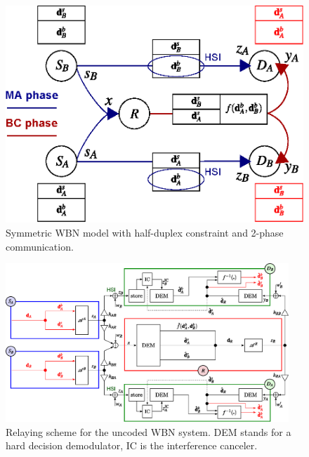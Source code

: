\documentclass{article}
\begin{document}
\begin{figure}
\centering{}
\includegraphics[width=0.6\columnwidth]{fig/2-SRN-sc_principle_BC-TWT_v4}
\caption{Symmetric WBN model with half-duplex constraint and 2-phase communication.\label{fig:CTUpp_Information_flows}}
\end{figure}


\begin{figure}
\begin{centering}
\includegraphics[width=0.95\textwidth]{fig/butterfly-2level_processing_principleTWC-uncoded}
\par\end{centering}
\caption{Relaying scheme for the uncoded WBN
system. DEM stands for a hard decision demodulator, IC is the interference
canceler.\label{fig:CTUpp_Information-flow-uncoded-block-scheme}}
\end{figure}
\end{document}
